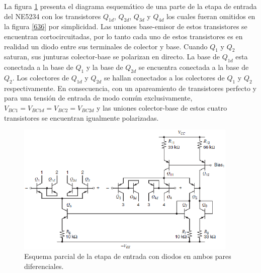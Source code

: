 \documentclass[12pt,a4paper,final,headinclude,footinclude,BCOR5mm]{scrartcl}
\begin{document}
La figura \ref{643} presenta el diagrama esquemático de una parte de la etapa de entrada del NE5234 con los transistores $Q_{1d}$, $Q_{2d}$, $Q_{3d}$ y $Q_{4d}$ los cuales fueran omitidos en la figura \ref{636} por simplicidad. Las uniones base-emisor de estos transistores se encuentran cortocircuitadas, por lo tanto cada uno de estos transistores es en realidad un diodo entre sus terminales de colector y base. Cuando $Q_{1}$ y $Q_{2}$ saturan, sus junturas colector-base se polarizan en directo. La base de $Q_{1d}$ esta conectada a la base de $Q_{1}$ y la base de $Q_{2d}$ se encuentra conectada a la base de $Q_{2}$. Los colectores de $Q_{1d}$ y $Q_{2d}$ se hallan conectados a los colectores de $Q_{1}$ y $Q_{2}$ respectivamente. En consecuencia, con un apareamiento de transistores perfecto y para una tensión de entrada de modo común exclusivamente,  $V_{BC1} = V_{BC1d} = V_{BC2} = V_{BC2d}$ y las uniones colector-base de estos cuatro transistores se encuentran igualmente polarizadas.

\begin{figure}[!h]
\begin{center}
\includegraphics[width=300pt]{./imagenes/neinputdiodos.png}
\end{center}
\caption{Esquema parcial de la etapa de entrada con diodos en ambos pares diferenciales.}
\label{643}
\end{figure}
\end{document}
